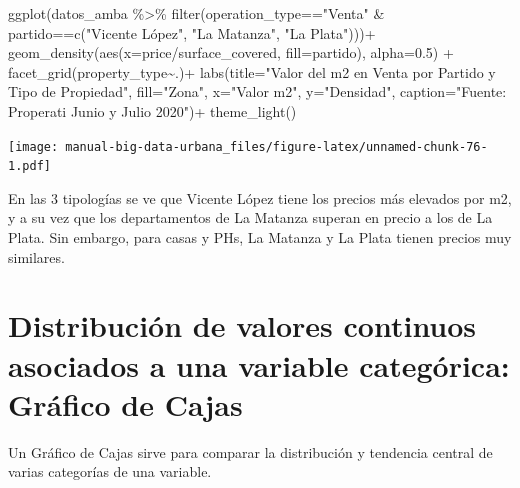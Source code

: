 \documentclass[
  spanish,
]{book}
\newenvironment{Shaded}{\begin{snugshade}}{\end{snugshade}}
\newcommand{\AttributeTok}[1]{\textcolor[rgb]{0.77,0.63,0.00}{#1}}
\newcommand{\FloatTok}[1]{\textcolor[rgb]{0.00,0.00,0.81}{#1}}
\newcommand{\FunctionTok}[1]{\textcolor[rgb]{0.00,0.00,0.00}{#1}}
\newcommand{\NormalTok}[1]{#1}
\newcommand{\SpecialCharTok}[1]{\textcolor[rgb]{0.00,0.00,0.00}{#1}}
\newcommand{\StringTok}[1]{\textcolor[rgb]{0.31,0.60,0.02}{#1}}
\begin{document}
\begin{Shaded}
\begin{Highlighting}[]
\FunctionTok{ggplot}\NormalTok{(datos\_amba }\SpecialCharTok{\%\textgreater{}\%}
         \FunctionTok{filter}\NormalTok{(operation\_type}\SpecialCharTok{==}\StringTok{"Venta"} \SpecialCharTok{\&}\NormalTok{ partido}\SpecialCharTok{==}\FunctionTok{c}\NormalTok{(}\StringTok{"Vicente López"}\NormalTok{, }\StringTok{"La Matanza"}\NormalTok{, }\StringTok{"La Plata"}\NormalTok{)))}\SpecialCharTok{+}
  \FunctionTok{geom\_density}\NormalTok{(}\FunctionTok{aes}\NormalTok{(}\AttributeTok{x=}\NormalTok{price}\SpecialCharTok{/}\NormalTok{surface\_covered, }\AttributeTok{fill=}\NormalTok{partido), }\AttributeTok{alpha=}\FloatTok{0.5}\NormalTok{) }\SpecialCharTok{+}
  \FunctionTok{facet\_grid}\NormalTok{(property\_type}\SpecialCharTok{\textasciitilde{}}\NormalTok{.)}\SpecialCharTok{+}
  \FunctionTok{labs}\NormalTok{(}\AttributeTok{title=}\StringTok{"Valor del m2 en Venta por Partido y Tipo de Propiedad"}\NormalTok{,}
       \AttributeTok{fill=}\StringTok{"Zona"}\NormalTok{,}
       \AttributeTok{x=}\StringTok{"Valor m2"}\NormalTok{,}
       \AttributeTok{y=}\StringTok{"Densidad"}\NormalTok{,}
       \AttributeTok{caption=}\StringTok{"Fuente: Properati Junio y Julio 2020"}\NormalTok{)}\SpecialCharTok{+}
  \FunctionTok{theme\_light}\NormalTok{()}
\end{Highlighting}
\end{Shaded}

\texttt{[image: manual-big-data-urbana\_files/figure-latex/unnamed-chunk-76-1.pdf]}

En las 3 tipologías se ve que Vicente López tiene los precios más elevados por m2, y a su vez que los departamentos de La Matanza superan en precio a los de La Plata. Sin embargo, para casas y PHs, La Matanza y La Plata tienen precios muy similares.

\hypertarget{distribuciuxf3n-de-valores-continuos-asociados-a-una-variable-categuxf3rica-gruxe1fico-de-cajas}{%
\section{Distribución de valores continuos asociados a una variable categórica: Gráfico de Cajas}\label{distribuciuxf3n-de-valores-continuos-asociados-a-una-variable-categuxf3rica-gruxe1fico-de-cajas}}

Un Gráfico de Cajas sirve para comparar la distribución y tendencia central de varias categorías de una variable.
\end{document}
